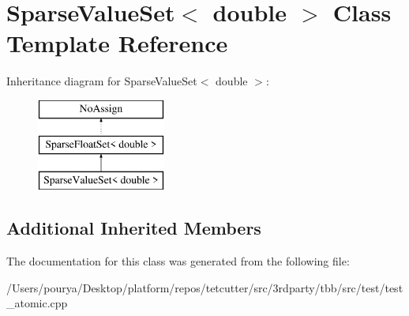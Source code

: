 \hypertarget{classSparseValueSet_3_01double_01_4}{}\section{Sparse\+Value\+Set$<$ double $>$ Class Template Reference}
\label{classSparseValueSet_3_01double_01_4}
Inheritance diagram for Sparse\+Value\+Set$<$ double $>$\+:\begin{figure}[H]
\begin{center}
\leavevmode
\includegraphics[height=3.000000cm]{classSparseValueSet_3_01double_01_4}
\end{center}
\end{figure}
\subsection*{Additional Inherited Members}


The documentation for this class was generated from the following file\+:\begin{DoxyCompactItemize}
\item 
/\+Users/pourya/\+Desktop/platform/repos/tetcutter/src/3rdparty/tbb/src/test/test\+\_\+atomic.\+cpp\end{DoxyCompactItemize}

